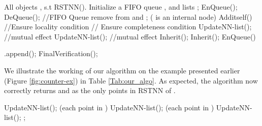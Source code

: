 \documentclass[prodmode,letterpaper]{acmsmall}
\newcommand{\rstknn}{RSTNN\xspace}
\begin{document}
\begin{spacing}{0.8}
\begin{algorithm}[tp]
\caption{\rstknn(: IUR-Tree root,: query)}
\begin{algorithmic}[1]
 All objects , s.t  RSTNN().
\State Initialize a FIFO queue , and lists ;
\State EnQueue();
	\State   DeQueue(); //FIFO Queue
			\State remove  from
			 and  ;
		\EndIf
	\EndFor
	\If(  is an internal node)
		\State Additself()				//Ensure locality condition
	\EndIf	
	   // Ensure completeness condition   
		\State UpdateNN-list(); //mutual effect
		\State UpdateNN-list(); //mutual effect
	\EndFor
				\State Inherit();
				\State Inherit();
				\State EnQueue()				
			\EndFor
			
		\Else
			\State .append(); 
		\EndIf
	\EndIf
\EndWhile
\State FinalVerification();
\end{algorithmic}
\end{algorithm}
\end{spacing} 
We illustrate the working of our algorithm on the example presented
earlier (Figure \ref{fig:counter-ex}) in
Table \ref{Tab:our_algo}. As expected, the algorithm now correctly returns  and 
as the only points in \rstknn of .

\begin{spacing}{0.8}
\begin{algorithm}[tp]
\begin{algorithmic}[1]
\State 
\While{}
			\State UpdateNN-list(); 
		\EndFor
		\For(each point  in )
			\State UpdateNN-list(); 
		\EndFor
		\For(each point  in  )
			\State UpdateNN-list(); 
		\EndFor				
			\State ;
		\EndIf
	\EndFor
\EndWhile
\EndFunction
\end{algorithmic}
\end{algorithm}
\end{spacing}
\end{document}
